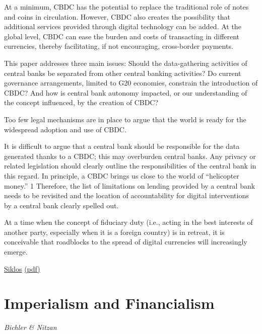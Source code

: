 \documentclass[
]{book}
\begin{document}
At a minimum,
CBDC has the potential to replace the traditional
role of notes and coins in circulation. However,
CBDC also creates the possibility that additional
services provided through digital technology
can be added. At the global level, CBDC can ease
the burden and costs of transacting in different
currencies, thereby facilitating, if not encouraging,
cross-border payments.

This paper addresses three main issues: Should
the data-gathering activities of central banks be
separated from other central banking activities?
Do current governance arrangements, limited
to G20 economies, constrain the introduction
of CBDC? And how is central bank autonomy
impacted, or our understanding of the concept
influenced, by the creation of CBDC?

Too few legal mechanisms are in place to argue that
the world is ready for the widespread adoption
and use of CBDC.

It is difficult to argue that a central bank
should be responsible for the data generated
thanks to a CBDC; this may overburden central
banks. Any privacy or related legislation should
clearly outline the responsibilities of the central
bank in this regard. In principle, a CBDC brings
us close to the world of ``helicopter money.'' 1
Therefore, the list of limitations on lending
provided by a central bank needs to be revisited
and the location of accountability for digital
interventions by a central bank clearly spelled out.

At a time when
the concept of fiduciary duty (i.e., acting in the best
interests of another party, especially when it is a
foreign country) is in retreat, it is conceivable that
roadblocks to the spread of digital currencies will
increasingly emerge.

\href{https://www.cigionline.org/publications/central-bank-digital-currency-and-governance-fit-purpose}{Siklos}
\href{pdf/Siklos_2021_Central_Bank_Digital_Currency.pdf}{(pdf)}

\hypertarget{imperialism-and-financialism-1}{%
\chapter{Imperialism and Financialism}\label{imperialism-and-financialism-1}}

\emph{Bichler \& Nitzan}
\end{document}
